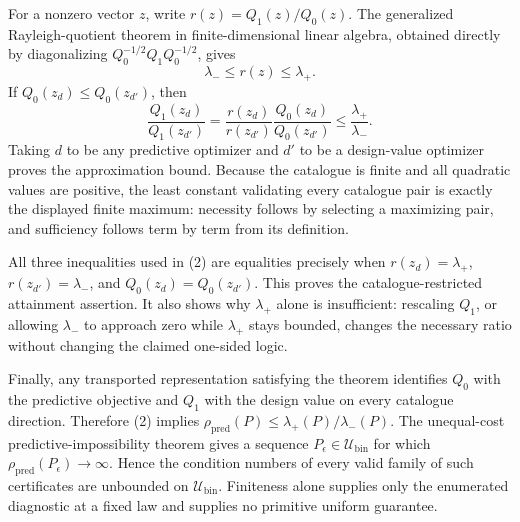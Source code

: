 For a nonzero vector \(z\), write \(r(z)=Q_1(z)/Q_0(z)\).  The generalized Rayleigh-quotient theorem in finite-dimensional linear algebra, obtained directly by diagonalizing \(Q_0^{-1/2}Q_1Q_0^{-1/2}\), gives
\[
 \lambda_-\le r(z)\le\lambda_+. \tag{1}
\]
If \(Q_0(z_d)\le Q_0(z_{d'})\), then
\[
 \frac{Q_1(z_d)}{Q_1(z_{d'})}
 =\frac{r(z_d)}{r(z_{d'})}
  \frac{Q_0(z_d)}{Q_0(z_{d'})}
 \le\frac{\lambda_+}{\lambda_-}. \tag{2}
\]
Taking \(d\) to be any predictive optimizer and \(d'\) to be a design-value optimizer proves the approximation bound.  Because the catalogue is finite and all quadratic values are positive, the least constant validating every catalogue pair is exactly the displayed finite maximum: necessity follows by selecting a maximizing pair, and sufficiency follows term by term from its definition.

All three inequalities used in (2) are equalities precisely when \(r(z_d)=\lambda_+\), \(r(z_{d'})=\lambda_-\), and \(Q_0(z_d)=Q_0(z_{d'})\).  This proves the catalogue-restricted attainment assertion.  It also shows why \(\lambda_+\) alone is insufficient: rescaling \(Q_1\), or allowing \(\lambda_-\) to approach zero while \(\lambda_+\) stays bounded, changes the necessary ratio without changing the claimed one-sided logic.

Finally, any transported representation satisfying the theorem identifies \(Q_0\) with the predictive objective and \(Q_1\) with the design value on every catalogue direction.  Therefore (2) implies \(\rho_{\mathrm{pred}}(P)\le\lambda_+(P)/\lambda_-(P)\).  The unequal-cost predictive-impossibility theorem gives a sequence \(P_\epsilon\in\mathcal U_{\mathrm{bin}}\) for which \(\rho_{\mathrm{pred}}(P_\epsilon)\to\infty\).  Hence the condition numbers of every valid family of such certificates are unbounded on \(\mathcal U_{\mathrm{bin}}\).  Finiteness alone supplies only the enumerated diagnostic at a fixed law and supplies no primitive uniform guarantee.